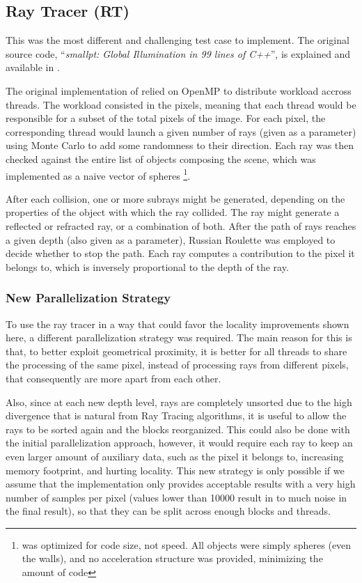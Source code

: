 \subsection{Ray Tracer (RT)}
\label{sec:cases:ray}

This was the most different and challenging test case to implement. The original source code, ``\textit{smallpt: Global Illumination in 99 lines of C++}'', is explained and available in \cite{99lines}.

The original implementation of \smallpt relied on OpenMP to distribute workload accross threads. The workload consisted in the pixels, meaning that each thread would be responsible for a subset of the total pixels of the image. For each pixel, the corresponding thread would launch a given number of rays (given as a parameter) using Monte Carlo to add some randomness to their direction. Each ray was then checked against the entire list of objects composing the scene, which was implemented as a naive vector of spheres \footnote{\smallpt was optimized for code size, not speed. All objects were simply spheres (even the walls), and no acceleration structure was provided, minimizing the amount of code}.

After each collision, one or more subrays might be generated, depending on the properties of the object with which the ray collided. The ray might generate a reflected or refracted ray, or a combination of both. After the path of rays reaches a given depth (also given as a parameter), Russian Roulette was employed to decide whether to stop the path. Each ray computes a contribution to the pixel it belongs to, which is inversely proportional to the depth of the ray.

\subsubsection{New Parallelization Strategy}
\label{sec:cases:ray:strat}

To use the ray tracer in a way that could favor the locality improvements shown here, a different parallelization strategy was required. The main reason for this is that, to better exploit geometrical proximity, it is better for all threads to share the processing of the same pixel, instead of processing rays from different pixels, that consequently are more apart from each other.

Also, since at each new depth level, rays are completely unsorted due to the high divergence that is natural from Ray Tracing algorithms, it is useful to allow the rays to be sorted again and the blocks reorganized. This could also be done with the initial parallelization approach, however, it would require each ray to keep an even larger amount of auxiliary data, such as the pixel it belongs to, increasing memory footprint, and hurting locality.
This new strategy is only possible if we assume that the implementation only provides acceptable results with a very high number of samples per pixel (values lower than 10000 result in to much noise in the final result), so that they can be split across enough blocks and threads.

